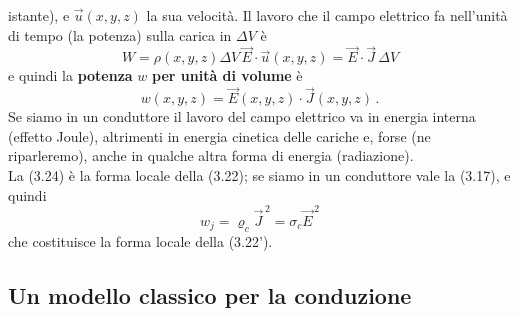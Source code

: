 istante), e $\vec u(x,y,z)$ la sua velocit\`a. Il lavoro che il campo elettrico
fa nell'unit\`a di tempo (la potenza) sulla carica in $\Delta V$ \`e
\begin{equation}
  W=\rho(x,y,z)\Delta V\,\vec E\cdot\vec u(x,y,z)=\vec E\cdot\vec J\,\Delta V
  \tag{3.23}
\end{equation}
e quindi la \textbf{potenza} $w$ \textbf{per unit\`a di volume} \`e
\begin{equation}
  w(x,y,z)=\vec E(x,y,z)\cdot\vec J(x,y,z)\,.
  \tag{3.24}
\end{equation}
Se siamo in un conduttore il lavoro del campo elettrico va in energia interna
(effetto Joule), altrimenti in energia cinetica delle cariche e, forse (ne
riparleremo), anche in qualche altra forma di energia (radiazione).\\
La (3.24) \`e la forma locale della (3.22); se siamo in un conduttore vale la
(3.17), e quindi
\begin{equation}
  w_j=\varrho_c\vec J^{\,2}=\sigma_c\vec E^{\,2}
  \tag{3.25}
\end{equation}
che costituisce la forma locale della (3.22').

\subsection{Un modello classico per la conduzione}

